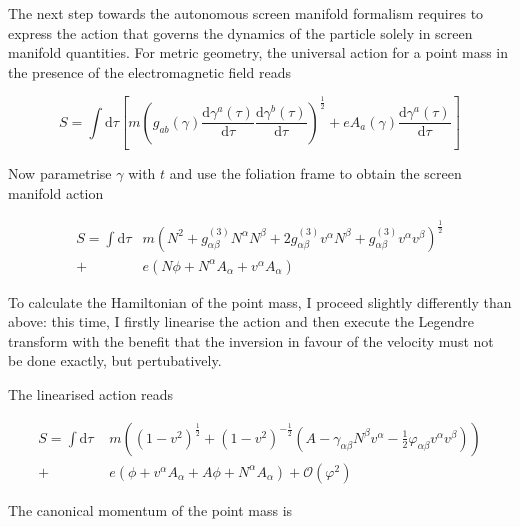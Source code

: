 \documentclass[11pt]{article}
\begin{document}
The next step towards the autonomous screen manifold formalism requires to express the action that governs the dynamics of the particle solely in screen manifold quantities. For metric geometry, the universal action for a point mass in the presence of the electromagnetic field reads

\begin{equation}
	S = \int \mathrm{d}\tau  \left[
	m \left( 
	g_{a b}\left( \gamma \right)
	\frac{\mathrm{d} \gamma^a\left( \tau \right) }{\mathrm{d}\tau}
	\frac{\mathrm{d} \gamma^b\left( \tau \right) }{\mathrm{d}\tau} \right)^{\frac{1}{2}}
	+ e A_a \left( \gamma  \right) 
	\frac{\mathrm{d} \gamma^a\left( \tau \right) }{\mathrm{d}\tau} 
	\right]
\end{equation}

Now parametrise $\gamma$ with $t$ and use the foliation frame to obtain the screen manifold action

\begin{equation}
\begin{split}
	S = \int \mathrm{d}\tau
	& m \left( 
	N^2 + g^{(3)}_{\alpha \beta} N^{\alpha} N^{\beta}
	+ 2 g^{(3)}_{\alpha \beta} v^\alpha N^\beta + g^{(3)}_{\alpha \beta} v^\alpha v^\beta 
	\right)^{\frac{1}{2}} \\
	+ \, & e \left( N \phi + N^\alpha A_\alpha + v^\alpha A_\alpha \right)
\end{split}
\end{equation}

To calculate the Hamiltonian of the point mass, I proceed slightly differently than above: this time, I firstly linearise the action and then execute the Legendre transform with the benefit that the inversion in favour of the velocity must not be done exactly, but pertubatively.

The linearised action reads

\begin{equation}
\begin{split}
	S = \int \mathrm{d}\tau  \, \, 
	& m \left(
	\left( 1 - v^2 \right)^{\frac{1}{2}}
	+ \left( 1 - v^2 \right)^{- \frac{1}{2}}
	\left( A - \gamma_{\alpha \beta} N^\beta v^\alpha - \frac{1}{2} \varphi_{\alpha \beta} v^\alpha v^\beta \right)
	\right)\\
	+ \, \, & e \left( \phi + v^\alpha A_\alpha + A \phi + N^\alpha A_\alpha \right) + \mathcal{O} \left(\varphi^2 \right)
\end{split}
\end{equation}

The canonical momentum of the point mass is
\end{document}
